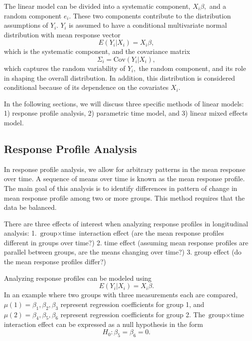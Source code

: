 \documentclass[12pt, twoside]{amherstthesis}
\begin{document}
The linear model can be divided into a systematic component, \(X_i\beta,\) and a random component \(e_i.\) These two components contribute to the distribution assumptions of \(Y_i.\) \(Y_i\) is assumed to have a conditional multivariate normal distribution with mean response vector \[E(Y_i|X_i) = X_i\beta,\] which is the systematic component, and the covariance matrix \[\Sigma_i = \text{Cov}(Y_i|X_i),\] which captures the random variability of \(Y_i,\) the random component, and its role in shaping the overall distribution. In addition, this distribution is considered conditional because of its dependence on the covariates \(X_i.\)

In the following sections, we will discuss three specific methods of linear models: 1) response profile analysis, 2) parametric time model, and 3) linear mixed effects model.

\hypertarget{response-profile-analysis}{%
\subsection{Response Profile Analysis}\label{response-profile-analysis}}

In response profile analysis, we allow for arbitrary patterns in the mean response over time. A sequence of means over time is known as the mean response profile. The main goal of this analysis is to identify differences in pattern of change in mean response profile among two or more groups. This method requires that the data be balanced.

There are three effects of interest when analyzing response profiles in longitudinal analysis:
1. \(\text{group} \times \text{time}\) interaction effect (are the mean response profiles different in groups over time?)
2. time effect (assuming mean response profiles are parallel between groups, are the means changing over time?)
3. group effect (do the mean response profiles differ?)

Analyzing response profiles can be modeled using \[E(Y_i|X_i) = X_i\beta.\] In an example where two groups with three measurements each are compared, \(\mu(1) = \beta_1,\beta_2,\beta_3\) represent regression coefficients for group 1, and \(\mu(2) = \beta_4,\beta_5,\beta_6\) represent regression coefficients for group 2. The \(\text{group} \times \text{time}\) interaction effect can be expressed as a null hypothesis in the form \[H_0: \beta_5 =\beta_6=0.\]
\end{document}
